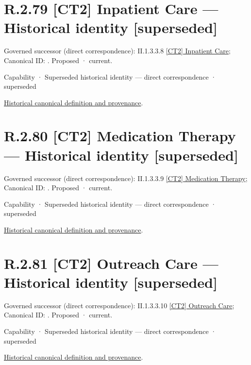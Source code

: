 \section*{R.2.79 [CT2] Inpatient Care — Historical identity [superseded]}
\label{navigation:R.2.79}

{\small Governed successor (direct correspondence): II.1.3.3.8 \hyperref[element:b39fb49c01b545a5b51d3313531efb1b]{[CT2] Inpatient Care}; Canonical ID: \texttt{}. Proposed · current.}\par
\label{element:bcc40a14465e48aca42c9505a6853081}
{\small Capability · Superseded historical identity — direct correspondence · superseded}\par
\href{../../../../continuum/strategy/capability/bcc40a14465e48aca42c9505a6853081.md}{Historical canonical definition and provenance}.\par
\section*{R.2.80 [CT2] Medication Therapy — Historical identity [superseded]}
\label{navigation:R.2.80}

{\small Governed successor (direct correspondence): II.1.3.3.9 \hyperref[element:bb04996164c94e0c827a020432f4e498]{[CT2] Medication Therapy}; Canonical ID: \texttt{}. Proposed · current.}\par
\label{element:db064e0cd4794479be1374e97a3d7e63}
{\small Capability · Superseded historical identity — direct correspondence · superseded}\par
\href{../../../../continuum/strategy/capability/db064e0cd4794479be1374e97a3d7e63.md}{Historical canonical definition and provenance}.\par
\section*{R.2.81 [CT2] Outreach Care — Historical identity [superseded]}
\label{navigation:R.2.81}

{\small Governed successor (direct correspondence): II.1.3.3.10 \hyperref[element:b9ddbe2dd6a7485ba9cd3482215ea09e]{[CT2] Outreach Care}; Canonical ID: \texttt{}. Proposed · current.}\par
\label{element:75f8b32a3d5048ccbdfb30d61ae73dad}
{\small Capability · Superseded historical identity — direct correspondence · superseded}\par
\href{../../../../continuum/strategy/capability/75f8b32a3d5048ccbdfb30d61ae73dad.md}{Historical canonical definition and provenance}.\par
